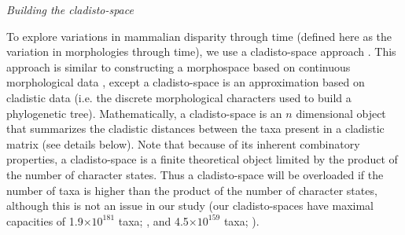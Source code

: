\documentclass[12pt,letterpaper]{article}
\renewcommand{\subsection}[1]{%
\bigskip
\begin{center}
\begin{large}
\normalfont\itshape #1
\end{large}
\end{center}}
\begin{document}
\subsection{Building the cladisto-space} %
To explore variations in mammalian disparity through time (defined here as the variation in morphologies through time), we use a cladisto-space approach \citep[e.g.][]{Foote01071994,Foote29111996,Wesley-Hunt2005,Brusatte12092008,Hughes20082013,friedmanexplosive2010,toljagictriassic-jurassic2013}. %
This approach is similar to constructing a morphospace based on continuous morphological data \citep[e.g.][]{friedmanexplosive2010,finlay2015morphological}, except a cladisto-space is an approximation based on cladistic data (i.e. the discrete morphological characters used to build a phylogenetic tree).
Mathematically, a cladisto-space is an $n$ dimensional object that summarizes the cladistic distances between the taxa present in a cladistic matrix (see details below).
Note that because of its inherent combinatory properties, a cladisto-space is a finite theoretical object limited by the product of the number of character states. Thus a cladisto-space will be overloaded if the number of taxa is higher than the product of the number of character states, although this is not an issue in our study (our cladisto-spaces have maximal capacities of 1.9$\times$$10^{181}$ taxa; \citealp{Slater2012MEE}, and 4.5$\times$$10^{159}$ taxa; \citealp{beckancient2014}). %

 
\end{document}
